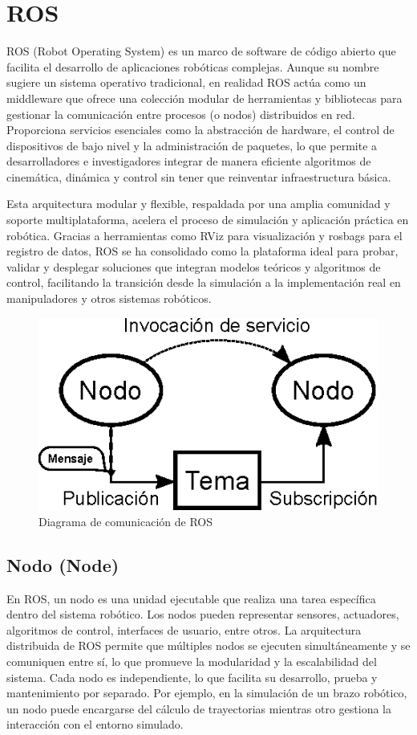 \section{ROS} \label{sec:ros}
ROS (Robot Operating System) es un marco de software de código abierto que facilita el desarrollo de aplicaciones robóticas complejas. Aunque su nombre sugiere un sistema operativo tradicional, en realidad ROS actúa como un middleware que ofrece una colección modular de herramientas y bibliotecas para gestionar la comunicación entre procesos (o nodos) distribuidos en red. Proporciona servicios esenciales como la abstracción de hardware, el control de dispositivos de bajo nivel y la administración de paquetes, lo que permite a desarrolladores e investigadores integrar de manera eficiente algoritmos de cinemática, dinámica y control sin tener que reinventar infraestructura básica.

Esta arquitectura modular y flexible, respaldada por una amplia comunidad y soporte multiplataforma, acelera el proceso de simulación y aplicación práctica en robótica. Gracias a herramientas como RViz para visualización y rosbags para el registro de datos, ROS se ha consolidado como la plataforma ideal para probar, validar y desplegar soluciones que integran modelos teóricos y algoritmos de control, facilitando la transición desde la simulación a la implementación real en manipuladores y otros sistemas robóticos.
\begin{figure}[h]
	\centering
	\includegraphics[width=0.5\linewidth]{img/ROS_concepts}
	\caption{Diagrama de comunicación de ROS}
	\label{fig:rosconcepts}
\end{figure}


\subsection{Nodo (Node)}
En ROS, un nodo es una unidad ejecutable que realiza una tarea específica dentro del sistema robótico. Los nodos pueden representar sensores, actuadores, algoritmos de control, interfaces de usuario, entre otros. La arquitectura distribuida de ROS permite que múltiples nodos se ejecuten simultáneamente y se comuniquen entre sí, lo que promueve la modularidad y la escalabilidad del sistema. Cada nodo es independiente, lo que facilita su desarrollo, prueba y mantenimiento por separado. Por ejemplo, en la simulación de un brazo robótico, un nodo puede encargarse del cálculo de trayectorias mientras otro gestiona la interacción con el entorno simulado.



